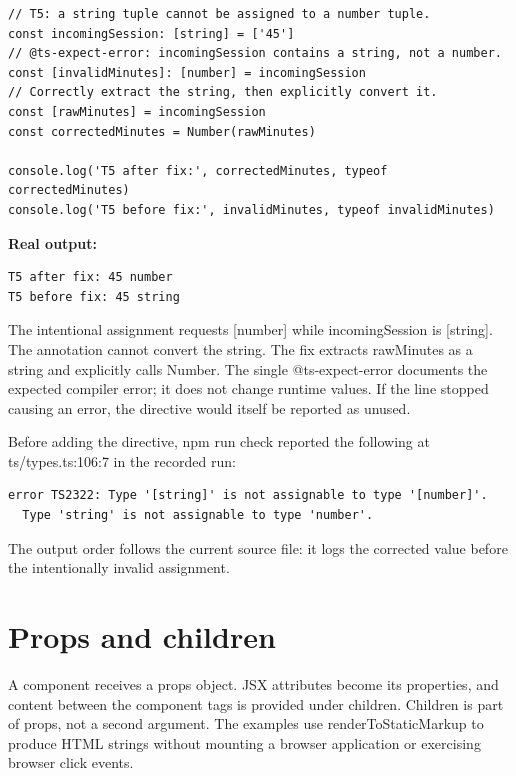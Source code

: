 \documentclass[10pt,a4paper]{article}
\begin{document}
\begin{lstlisting}[language=GuideJS]
// T5: a string tuple cannot be assigned to a number tuple.
const incomingSession: [string] = ['45']
// @ts-expect-error: incomingSession contains a string, not a number.
const [invalidMinutes]: [number] = incomingSession
// Correctly extract the string, then explicitly convert it.
const [rawMinutes] = incomingSession
const correctedMinutes = Number(rawMinutes)

console.log('T5 after fix:', correctedMinutes, typeof correctedMinutes)
console.log('T5 before fix:', invalidMinutes, typeof invalidMinutes)
\end{lstlisting}


\textbf{Real output:}

\begin{lstlisting}[language={}]
T5 after fix: 45 number
T5 before fix: 45 string
\end{lstlisting}

The intentional assignment requests [number] while incomingSession is [string]. The annotation cannot convert the string. The fix extracts rawMinutes as a string and explicitly calls Number. The single @ts-expect-error documents the expected compiler error; it does not change runtime values. If the line stopped causing an error, the directive would itself be reported as unused.


Before adding the directive, npm run check reported the following at ts/types.ts:106:7 in the recorded run:

\begin{lstlisting}[language={}]
error TS2322: Type '[string]' is not assignable to type '[number]'.
  Type 'string' is not assignable to type 'number'.
\end{lstlisting}

The output order follows the current source file: it logs the corrected value before the intentionally invalid assignment.

\section{Props and children}

A component receives a props object. JSX attributes become its properties, and content between the component tags is provided under children. Children is part of props, not a second argument. The examples use renderToStaticMarkup to produce HTML strings without mounting a browser application or exercising browser click events.
\end{document}

